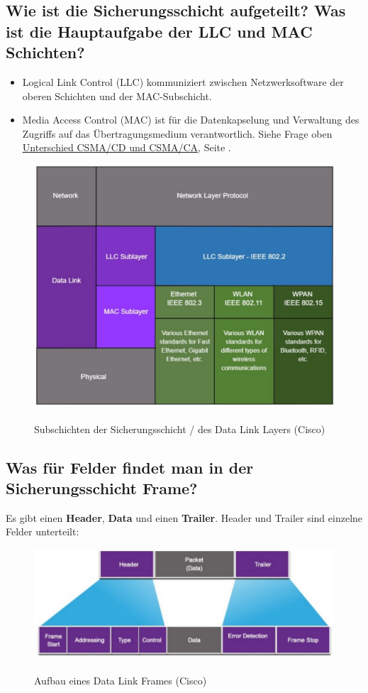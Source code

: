 \subsection*{Wie ist die Sicherungsschicht aufgeteilt? Was ist die Hauptaufgabe der LLC und MAC Schichten?}\label{sub:LLC_MAC}
\begin{itemize}
    \item Logical Link Control (LLC) kommuniziert zwischen Netzwerksoftware der oberen Schichten und der MAC-Subschicht.
    \item Media Access Control (MAC) ist für die Datenkapselung und Verwaltung des Zugriffs auf das Übertragungsmedium verantwortlich. Siehe Frage oben \underline{\hyperref[sub:csma]{Unterschied CSMA/CD und CSMA/CA}}, Seite \pageref{sub:csma}.
\end{itemize}

\begin{figure}[H]
    \begin{center}
    \label{pic:DataLinkLayer_LLC_MAC}
    \includegraphics[width=.6\textwidth]{images/DLL_Sublayers.jpg}
    \caption{Subschichten der Sicherungsschicht / des Data Link Layers (\textsuperscript{\textcopyright}Cisco)}
    \end{center}
\end{figure}

\subsection*{Was für Felder findet man in der Sicherungsschicht Frame?}
Es gibt einen \textbf{Header}, \textbf{Data} und einen \textbf{Trailer}. Header und Trailer sind einzelne Felder unterteilt:

\begin{figure}[H]
    \begin{center}
    \label{pic:DataLinkFrame}
    \includegraphics[width=\textwidth]{images/Data_Link_Frame.jpg}
    \caption{Aufbau eines Data Link Frames (\textsuperscript{\textcopyright}Cisco)}
    \end{center}
\end{figure}

